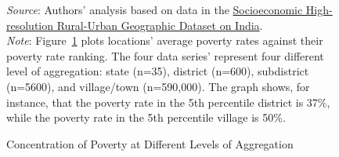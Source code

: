 \documentclass[12pt,letterpaper]{article}
\begin{document}
\begin{appendix}
\newpage
\begin{figure}[H]\caption{Concentration of Poverty at Different Levels of Aggregation}
  \begin{center}
  \end{center}

\begin{adjustwidth}{2cm}{2cm}
  \footnotesize{\textit{Source}: Authors' analysis based on data in the
  \href{http://www.devdatalab.org/shrug}{Socioeconomic High-resolution
    Rural-Urban Geographic Dataset on India}. \\ \textit{Note}: Figure~\ref{fig:pov_dist} plots locations' average
    poverty rates against their poverty rate ranking. The four data
    series' represent four different level of aggregation: state
    (n=35), district (n=600), subdistrict (n=5600), and village/town
    (n=590,000). The graph shows, for instance, that the poverty rate
    in the 5th percentile district is 37\%, while the poverty rate in
    the 5th percentile village is 50\%.}

\end{adjustwidth}

\label{fig:pov_dist}
\end{figure}


\end{appendix}
\end{document}
